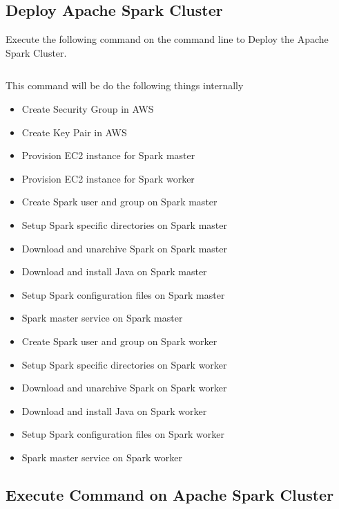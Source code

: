 \subsection{Deploy Apache Spark Cluster}

Execute the following command on the command line to Deploy the Apache
Spark Cluster.

\begin{verbatim}

\end{verbatim}

This command will be do the following things internally 

\begin{itemize}
	\item Create Security Group in AWS
	\item Create Key Pair in AWS
	\item Provision EC2 instance for Spark master
	\item Provision EC2 instance for Spark worker
	\item Create Spark user and group on Spark master
	\item Setup Spark specific directories on Spark master
	\item Download and unarchive Spark  on Spark master
	\item Download and install Java  on Spark master
	\item Setup Spark configuration files on Spark master
	\item Spark master service on Spark master
	\item Create Spark user and group on Spark worker
	\item Setup Spark specific directories on Spark worker
	\item Download and unarchive Spark  on Spark worker
	\item Download and install Java  on Spark worker
	\item Setup Spark configuration files on Spark worker
	\item Spark master service on Spark worker	
\end{itemize}

\subsection{Execute Command on Apache Spark Cluster}


